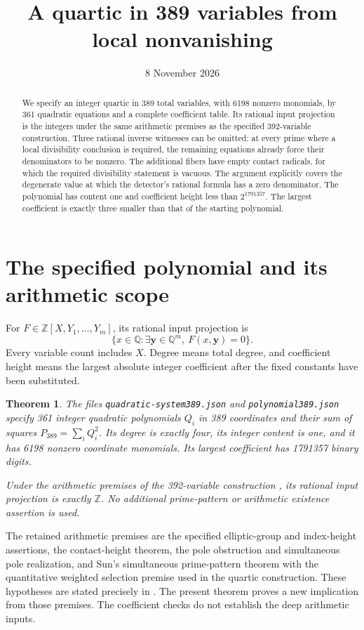 \documentclass[11pt,a4paper]{article}
\title{A quartic in 389 variables from local nonvanishing}
\author{}\date{8 November 2026}
\newtheorem{theorem}{Theorem}[section]
\theoremstyle{remark}\newtheorem{remark}[theorem]{Remark}
\newcommand{\Q}{\mathbb Q}\newcommand{\Z}{\mathbb Z}
\begin{document}
\maketitle
\begin{abstract}
We specify an integer quartic in 389 total variables, with 6198 nonzero
monomials, by 361 quadratic equations and a complete coefficient table.
Its rational input projection is the integers under the same arithmetic
premises as the specified 392-variable construction. Three rational
inverse witnesses can be omitted: at every prime where a local
divisibility conclusion is required, the remaining equations already
force their denominators to be nonzero. The additional fibers have
empty contact radicals, for which the required divisibility statement
is vacuous. The argument explicitly covers the degenerate value at
which the detector's rational formula has a zero denominator.
The polynomial has content one and coefficient height less than
$2^{1791357}$. The largest coefficient is exactly three smaller than
that of the starting polynomial.
\end{abstract}

\section{The specified polynomial and its arithmetic scope}
For $F\in\Z[X,Y_1,\ldots,Y_m]$, its rational input projection is
\[
 \{x\in\Q:\exists\boldsymbol y\in\Q^m,\ F(x,\boldsymbol y)=0\}.
\]
Every variable count includes $X$. Degree means total degree, and
coefficient height means the largest absolute integer coefficient after
the fixed constants have been substituted.

\begin{theorem}\label{thm:main}
The files \nolinkurl{quadratic-system389.json} and
\nolinkurl{polynomial389.json} specify 361 integer quadratic polynomials
$Q_i$ in 389 coordinates and their sum of squares
$P_{389}=\sum_iQ_i^2$. Its degree is exactly four, its integer content
is one, and it has 6198 nonzero coordinate monomials. Its largest
coefficient has 1791357 binary digits.

Under the arithmetic premises of the 392-variable construction
\cite{Construction392}, its rational input projection is exactly $\Z$.
No additional prime-pattern or arithmetic existence assertion is used.
\end{theorem}

The retained arithmetic premises are the specified elliptic-group and
index-height assertions, the contact-height theorem, the pole obstruction
and simultaneous pole realization, and Sun's simultaneous prime-pattern
theorem with the quantitative weighted selection premise used in the
quartic construction. These hypotheses are stated precisely in
\cite[Section~2]{Construction392}. The present theorem proves a new
implication from those premises. The coefficient checks do not establish
the deep arithmetic inputs.
\end{document}
